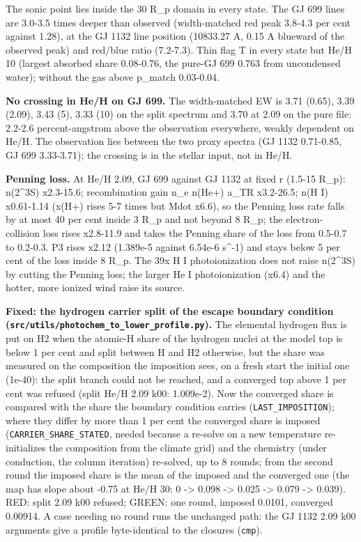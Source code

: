 \documentclass[english,a4paper]{my_memo}
\begin{document}
The sonic point lies inside the 30 R\_p domain in every state. The GJ 699
lines are 3.0-3.5 times deeper than observed (width-matched red peak
3.8-4.3 per cent against 1.28), at the GJ 1132 line position (10833.27 A,
0.15 A blueward of the observed peak) and red/blue ratio (7.2-7.3). Thin
flag T in every state but He/H 10 (largest absorbed share 0.08-0.76, the
pure-GJ 699 0.763 from uncondensed water); without the gas above p\_match
0.03-0.04.

\textbf{No crossing in He/H on GJ 699.} The width-matched EW is 3.71 (0.65),
3.39 (2.09), 3.43 (5), 3.33 (10) on the split spectrum and 3.70 at 2.09 on
the pure file: 2.2-2.6 percent-angstrom above the observation everywhere,
weakly dependent on He/H. The observation lies between the two proxy
spectra (GJ 1132 0.71-0.85, GJ 699 3.33-3.71); the crossing is in the
stellar input, not in He/H.

\textbf{Penning loss.} At He/H 2.09, GJ 699 against GJ 1132 at fixed r (1.5-15
R\_p): n(2\^{}3S) x2.3-15.6; recombination gain n\_e n(He+) a\_TR x3.2-26.5;
n(H I) x0.61-1.14 (x(H+) rises 5-7 times but Mdot x6.6), so the Penning
loss rate falls by at most 40 per cent inside 3 R\_p and not beyond 8 R\_p;
the electron-collision loss rises x2.8-11.9 and takes the Penning share of
the loss from 0.5-0.7 to 0.2-0.3. P3 rises x2.12 (1.389e-5 against 6.54e-6
s\^{}-1) and stays below 5 per cent of the loss inside 8 R\_p. The 39x H I
photoionization does not raise n(2\^{}3S) by cutting the Penning loss; the
larger He I photoionization (x6.4) and the hotter, more ionized wind raise
its source.

\textbf{Fixed: the hydrogen carrier split of the escape boundary condition
(\texttt{src/utils/photochem\_to\_lower\_profile.py}).} The elemental hydrogen flux
is put on H2 when the atomic-H share of the hydrogen nuclei at the model top
is below 1 per cent and split between H and H2 otherwise, but the share was
measured on the composition the imposition sees, on a fresh start the
initial one (1e-40): the split branch could not be reached, and a converged
top above 1 per cent was refused (split He/H 2.09 k00: 1.009e-2). Now the
converged share is compared with the share the boundary condition carries
(\texttt{LAST\_IMPOSITION}); where they differ by more than 1 per cent the converged
share is imposed (\texttt{CARRIER\_SHARE\_STATED}, needed because a re-solve on a new
temperature re-initializes the composition from the climate grid) and the
chemistry (under conduction, the column iteration) re-solved, up to 8
rounds; from the second round the imposed share is the mean of the imposed
and the converged one (the map has slope about -0.75 at He/H 30: 0 -\textgreater{}
0.098 -\textgreater{} 0.025 -\textgreater{} 0.079 -\textgreater{} 0.039). RED: split 2.09 k00 refused; GREEN: one
round, imposed 0.0101, converged 0.00914. A case needing no round runs the
unchanged path: the GJ 1132 2.09 k00 arguments give a profile
byte-identical to the closure\textquotesingle s (\texttt{cmp}).
\end{document}
